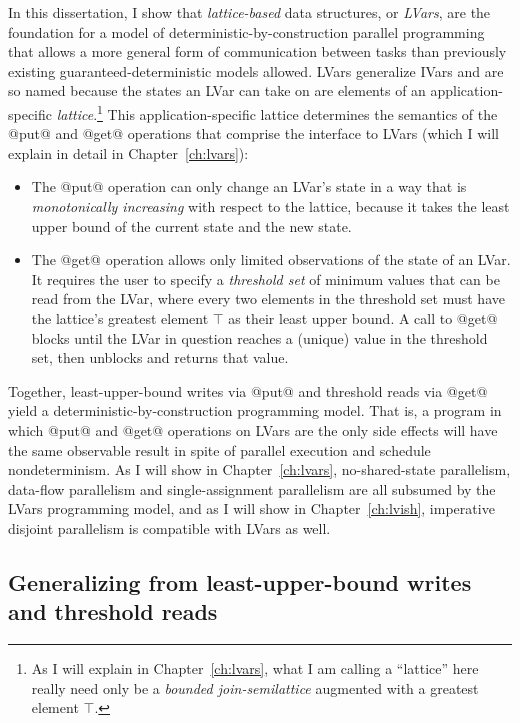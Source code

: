In this dissertation, I show that \emph{lattice-based} data
structures, or \emph{LVars}, are the foundation for a model of
deterministic-by-construction parallel programming that allows a more
general form of communication between tasks than previously existing
guaranteed-deterministic models allowed.  LVars generalize IVars and
are so named because the states an LVar can take on are elements of an
application-specific \emph{lattice}.\footnote{As I will explain in
  Chapter~\ref{ch:lvars}, what I am calling a ``lattice'' here really
  need only be a {\em bounded join-semilattice} augmented with a
  greatest element $\top$.}  This application-specific lattice
determines the semantics of the @put@ and @get@ operations that
comprise the interface to LVars (which I will explain in detail in
Chapter~\ref{ch:lvars}):
\begin{itemize}
\item The @put@ operation can only change an LVar's state in a way
  that is {\em monotonically increasing} with respect to the lattice,
  because it takes the least upper bound of the current state and the
  new state.
\item The @get@ operation allows only limited observations of the
  state of an LVar.  It requires the user to specify a \emph{threshold
    set} of minimum values that can be read from the LVar, where every
  two elements in the threshold set must have the lattice's greatest
  element $\top$ as their least upper bound.  A call to @get@ blocks until the
  LVar in question reaches a (unique) value in the threshold set, then
  unblocks and returns that value.
\end{itemize}
Together, least-upper-bound writes via @put@ and threshold reads via
@get@ yield a deterministic-by-construction programming model.  That
is, a program in which @put@ and @get@ operations on LVars are the
only side effects will have the same observable result in spite of
parallel execution and schedule nondeterminism.   As I will show in
Chapter~\ref{ch:lvars}, no-shared-state parallelism, data-flow
parallelism and single-assignment parallelism are all subsumed by the
LVars programming model, and as I will show in
Chapter~\ref{ch:lvish},
imperative disjoint parallelism is compatible with LVars as well.

\subsection{Generalizing from least-upper-bound writes and threshold reads}\label{subsection:intro-generalizing}

